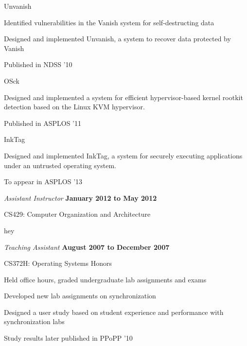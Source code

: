 \documentclass[10pt]{article}
\newenvironment{outerlist}[1][\enskip\textbullet]%
        {\begin{itemize}[#1]}{\end{itemize}%
         \vspace{-.6\baselineskip}}
\newenvironment{innerlist}[1][\enskip\textbullet]%
        {\begin{compactitem}[#1]}{\end{compactitem}}
\begin{document}
\begin{outerlist}
\begin{innerlist}
        \item Unvanish
        \begin{innerlist}
           \item Identified vulnerabilities in the Vanish system for
self-destructing data
           \item Designed and implemented Unvanish, a system to recover
data protected by Vanish
           \item Published in NDSS '10
         \end{innerlist}
         \item OSck
         \begin{innerlist}
            \item Designed and implemented a system for efficient
hypervisor-based kernel rootkit detection based on the Linux KVM hypervisor.
            \item Published in ASPLOS '11
         \end{innerlist}
         \item InkTag
         \begin{innerlist}
            \item Designed and implemented InkTag, a system for securely
executing applications under an untrusted operating system.
            \item To appear in ASPLOS '13
         \end{innerlist}
    \end{innerlist}
\item[] \textit{Assistant Instructor}%
        \hfill \textbf{January 2012 to May 2012}
        \begin{innerlist}
           \item CS429: Computer Organization and Architecture
           \begin{innerlist}
              \item hey
           \end{innerlist}
        \end{innerlist}
\item[] \textit{Teaching Assistant}%
        \hfill \textbf{August 2007 to December 2007}
        \begin{innerlist}
           \item CS372H: Operating Systems Honors
           \begin{innerlist}
              \item Held office hours, graded undergraduate lab assignments and exams
              \item Developed new lab assignments on synchronization
              \item Designed a user study based on student experience and
performance with synchronization labs
              \item Study results later published in PPoPP '10
           \end{innerlist}
        \end{innerlist}
\end{outerlist}
\end{document}
